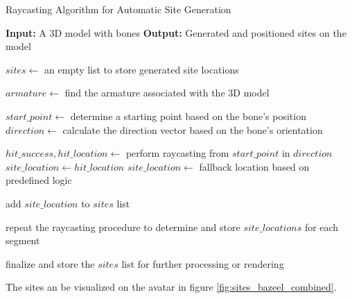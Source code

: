 \documentclass[../../main.tex]{subfiles}
\begin{document}
\begin{algorithm}
    \label{alg:site_generation_with_raycasting}
    \caption{Raycasting Algorithm for Automatic Site Generation}
    \begin{algorithmic}
        \State \textbf{Input:} A 3D model with bones
        \State \textbf{Output:} Generated and positioned sites on the model

        \State $sites \gets$ an empty list to store generated site locations

        \State {}

        \State $armature \gets$ find the armature associated with the 3D model

            \State $start\_point \gets$ determine a starting point based on the bone's position
            \State $direction \gets$ calculate the direction vector based on the bone's orientation
            
            \State $hit\_success, hit\_location \gets$ perform raycasting from $start\_point$ in $direction$
                \State $site\_location \gets hit\_location$
            \Else
                \State $site\_location \gets$ fallback location based on predefined logic
            \EndIf

            \State add $site\_location$ to $sites$ list
            
            \State {}
        \EndFor

                \State repeat the raycasting procedure to determine and store $site\_locations$ for each segment
            \EndFor
        \EndFor

        \State finalize and store the $sites$ list for further processing or rendering
    \end{algorithmic}
\end{algorithm}

The sites an be visualized on the avatar in figure \ref{fig:sites_bazeel_combined}.
\end{document}
